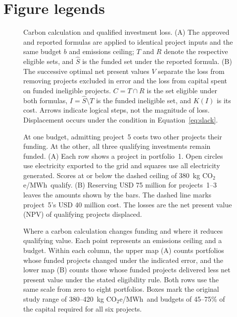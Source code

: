 \documentclass[HARVARD,twocolumn]{USG}
\newcommand{\unit}{kg CO$_2$e/MWh}
\begin{document}
  \section*{Figure legends}
\begin{figure}[!ht]
\centering
\caption{Carbon calculation and qualified investment loss. (A) The approved and reported formulas are applied to identical project inputs and the same budget $b$ and emissions ceiling; $T$ and $R$ denote the respective eligible sets, and $\widehat S$ is the funded set under the reported formula. (B) The successive optimal net present values $V$ separate the loss from removing projects excluded in error and the loss from capital spent on funded ineligible projects. $C=T\cap R$ is the set eligible under both formulas, $I=\widehat S\setminus T$ is the funded ineligible set, and $K(I)$ is its cost. Arrows indicate logical steps, not the magnitude of loss. Displacement occurs under the condition in Equation~\eqref{eq:slack}.}\label{fig:mechanism}
\end{figure}
\begin{figure}[!ht]
\centering

\caption{At one budget, admitting project~5 costs two other projects their funding. At the other, all three qualifying investments remain funded. (A) Each row shows a project in portfolio~1. Open circles use electricity exported to the grid and squares use all electricity generated. Scores at or below the dashed ceiling of 380~\unit\ qualify. (B) Reserving USD 75 million for projects~1--3 leaves the amounts shown by the bars. The dashed line marks project~5's USD 40 million cost. The losses are the net present value (NPV) of qualifying projects displaced.}\label{fig:project}

\end{figure}
\begin{figure}[!ht]
\centering

\caption{Where a carbon calculation changes funding and where it reduces qualifying value. Each point represents an emissions ceiling and a budget. Within each column, the upper map (A) counts portfolios whose funded projects changed under the indicated error, and the lower map (B) counts those whose funded projects delivered less net present value under the stated eligibility rule. Both rows use the same scale from zero to eight portfolios. Boxes mark the original study range of 380--420~\unit\ and budgets of 45--75\% of the capital required for all six projects.}\label{fig:map}

\end{figure}
\clearpage
\fi
\end{document}
